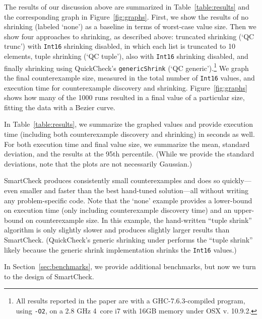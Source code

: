 \documentclass{sigplanconf}
\newcommand{\ttp}[1]{\texttt{#1}}
\begin{document}
The results of our discussion above are summarized in Table~\ref{table:results}
and the corresponding graph in Figure~\ref{fig:graphs}.  First, we show the
results of no shrinking (labeled `none') as a baseline in terms of worst-case
value size.  Then we show four approaches to shrinking, as described above:
truncated shrinking (`QC trunc') with \ttp{Int16} shrinking disabled, in which
each list is truncated to 10 elements, tuple shrinking (`QC tuple'), also with
\ttp{Int16} shrinking disabled, and finally shrinking using QuickCheck's
\ttp{genericShrink} (`QC generic').\footnote{All results
  reported in the paper are with a GHC-7.6.3-compiled program, using \ttp{-O2},
  on a 2.8 GHz 4~core i7 with 16GB memory under OSX v. 10.9.2.}  We graph the
final counterexample size, measured in the total number of \ttp{Int16} values,
and execution time for counterexample discovery and shrinking.
Figure~\ref{fig:graphs} shows how many of the 1000 runs resulted in a final
value of a particular size, fitting the data with a Bezier curve.

In Table~\ref{table:results}, we summarize the graphed values and provide
execution time (including both counterexample discovery and shrinking) in
seconds as well.  For both execution time and final value size, we summarize the
mean, standard deviation, and the results at the 95th percentile.
(While we provide the standard deviations, note that the plots are not
necessarily Gaussian.)

SmartCheck produces consistently small counterexamples and does so
quickly---even smaller and faster than the best hand-tuned solution---all
without writing any problem-specific code.  Note that the `none' example
provides a lower-bound on execution time (only including counterexample
discovery time) and an upper-bound on counterexample size.  In this example, the
hand-written ``tuple shrink'' algorithm is only slightly slower and produces
slightly larger results than SmartCheck.  (QuickCheck's generic shrinking under
performs the ``tuple shrink'' likely because the generic shrink implementation
shrinks the \ttp{Int16} values.)

In Section~\ref{sec:benchmarks}, we provide additional benchmarks, but now we
turn to the design of SmartCheck.


\end{document}
